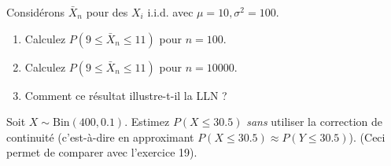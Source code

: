 \begin{exercicebox}
Considérons $\bar{X}_n$ pour des $X_i$ i.i.d. avec $\mu=10, \sigma^2=100$.
\begin{enumerate}
    \item Calculez $P(9 \le \bar{X}_n \le 11)$ pour $n=100$.
    \item Calculez $P(9 \le \bar{X}_n \le 11)$ pour $n=10000$.
    \item Comment ce résultat illustre-t-il la LLN ?
\end{enumerate}
\end{exercicebox}

\begin{exercicebox}
Soit $X \sim \text{Bin}(400, 0.1)$. Estimez $P(X \le 30.5)$ \textit{sans} utiliser la correction de continuité (c'est-à-dire en approximant $P(X \le 30.5) \approx P(Y \le 30.5)$).
(Ceci permet de comparer avec l'exercice 19).
\end{exercicebox}